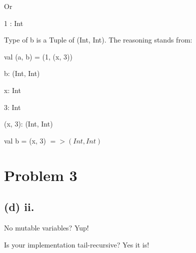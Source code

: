 \documentclass[11pt, oneside]{article}
\newcommand{\forceindent}{\leavevmode{\parindent=1.5em\indent}}
\newcommand{\forceindentx}{\leavevmode{\parindent=2em\indent}}
\begin{document}
\par Or

\par \forceindentx 1 : Int

\par Type of b is a Tuple of (Int, Int). The reasoning stands from:

\par val (a, b) = (1, (x, 3))
\par \forceindentx b: (Int, Int)
\par \forceindentx x: Int
\par \forceindentx 3: Int
\par \forceindentx (x, 3): (Int, Int)
\par \forceindentx val b = (x, 3) $=> (Int, Int)$

\section{Problem 3}

\subsection*{(d) ii.}
\forceindent No mutable variables? Yup!
\par Is your implementation tail-recursive? Yes it is!
\end{document}
